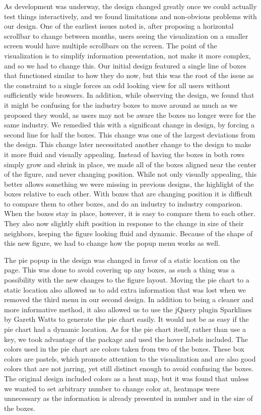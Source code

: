 \documentclass[journal]{vgtc}                %
\begin{document}
As development was underway, the design changed greatly once we could actually test things interactively, and we found 
limitations and non-obvious problems with our design. One of the earliest issues noted is, after proposing a horizontal
scrollbar to change between months, users seeing the visualization on a smaller screen would have multiple scrollbars 
on the screen. The point of the visualization is to simplify information presentation, not make it more complex, and so 
we had to change this. Our initial design featured a single line of boxes that functioned similar to how they do now,
but this was the root of the issue as the constraint to a single forces an odd looking view for all users without 
sufficiently wide browsers. In addition, while observing the design, we found that it might be confusing for the industry
boxes to move around as much as we proposed they would, as users may not be aware the boxes no longer were for the same 
industry. We remedied this with a significant change in design, by forcing a second line for half the boxes. This change 
was one of the largest deviations from the design. This change later necessitated another change to the design to make
it more fluid and visually appealing. Instead of having the boxes in both rows simply grow and shrink in place, we made
all of the boxes aligned near the center of the figure, and never changing position. While not only visually appealing, this better allows something 
we were missing in previous designs, the highlight of the boxes relative to each other. With boxes that are changing position
it is difficult to compare them to other boxes, and do an industry to industry comparison. When the boxes stay in place, 
however, it is easy to compare them to each other. They also now slightly shift position in response to the change in size
of their neighbors, keeping the figure looking fluid and dynamic. Because of the shape of this new figure, we had to change 
how the popup menu works as well.

The pie popup in the design was changed in favor of a static location on the page. This was done to avoid covering up any 
boxes, as such a thing was a possibility with the new changes to the figure layout. Moving the pie chart to a static 
location also allowed us to add extra information that was lost when we removed the third menu in our second design. In 
addition to being a cleaner and more informative method, it also allowed us to use the jQuery plugin Sparklines by Gareth Watts to 
generate the pie chart easily. It would not be as easy if the pie chart had a dynamic location. As for the pie chart itself,
rather than use a key, we took advantage of the package and used the hover labels included. The colors used in the pie chart
are colors taken from two of the boxes. These box colors are pastels, which promote attention to the visualization and are 
also good colors that are not jarring, yet still distinct enough to avoid confusing the boxes. The original design included
colors as a heat map, but it was found that unless we wanted to set arbitrary number to change color at, heatmaps were 
unnecessary as the information is already presented in number and in the size of the boxes.
\end{document}
